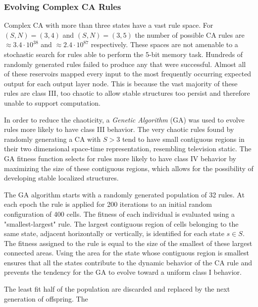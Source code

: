 \documentclass{elsarticle}
\begin{document}
\begin{multicols}{2}
  \subsubsection{Evolving Complex CA Rules}
Complex CA with more than three states have a vast rule space. For $(S,N) = 
   (3,4)$ and $(S,N) = (3,5)$ the number of possible CA rules are $\approx 3.4 
   \cdot 10^{38}$ and $\approx 2.4 \cdot 10^{87}$ respectively. These spaces 
   are not amenable to a stochastic search for rules able to perform the 5-bit 
   memory task.  Hundreds of randomly generated rules failed to produce any 
   that were successful. Almost all of these reservoirs mapped every input to 
   the most frequently occurring expected output for each output layer node.  
   This is because the vast majority of these rules are class III, too chaotic 
   to allow stable structures too persist and therefore unable to support 
   computation.\par
In order to reduce the chaoticity, a \textit{Genetic Algorithm} (GA) 
\cite{mitchell1996evolving} was used to evolve rules more likely to have class 
III behavior. The very chaotic rules found by randomly generating a CA with $S 
> 3$ tend to have small contiguous regions in their two dimensional space-time 
representation, resembling television static.  The GA fitness function selects 
for rules more likely to have class IV behavior by maximizing the size of these 
   contiguous regions, which allows for the possibility of developing stable 
      localized structures. \par The GA algorithm starts with a randomly 
      generated population of 32 rules. At each epoch the rule is applied for 
      200 iterations to an initial random configuration of 400 cells.  The 
      fitness of each individual is evaluated using a "smallest-largest" rule.  
      The largest contiguous region of cells belonging to the same state, 
          adjacent horizontally or vertically, is identified for each state $s 
             \in S$. The fitness assigned to the rule is equal to the size of 
             the smallest of these largest connected areas. Using the area for 
             the state whose contiguous region is smallest ensures that all the 
             states contribute to the dynamic behavior of the CA rule and 
             prevents the tendency for the GA to evolve toward a uniform class 
             I behavior.  \par The least fit half of the population are 
             discarded and replaced by the next generation of offspring.  The 

\end{multicols}
\end{document}
